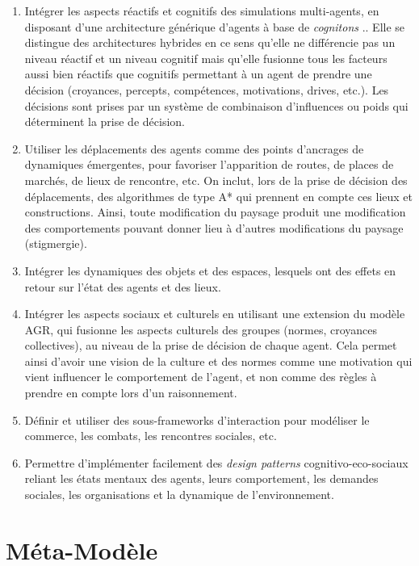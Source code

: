 \documentclass[a4paper,oneside,12 pt]{article}
\begin{document}
\begin{enumerate}
  \item Intégrer les aspects réactifs et cognitifs des simulations multi-agents, en disposant d’une architecture générique d’agents à base de \emph{cognitons} \cite{jacques1995systemes}.. Elle se distingue des architectures hybrides en ce sens qu’elle ne différencie pas un niveau réactif et un niveau cognitif mais qu’elle fusionne tous les facteurs aussi bien réactifs que cognitifs permettant à un agent de prendre une décision (croyances, percepts, compétences, motivations, drives, etc.). Les décisions sont prises par un système de combinaison d’influences ou poids qui déterminent la prise de décision.
  \item Utiliser les déplacements des agents comme des points d'ancrages de dynamiques émergentes, pour favoriser l'apparition de routes, de places de marchés, de lieux de rencontre, etc. On inclut, lors de la prise de décision des déplacements, des algorithmes de type A* qui prennent en compte ces lieux et constructions. Ainsi, toute modification du paysage produit une modification des comportements pouvant donner lieu à d'autres modifications du paysage (stigmergie).
  \item Intégrer les dynamiques des objets et des espaces, lesquels ont des effets en retour sur l'état des agents et des lieux.
  \item Intégrer les aspects sociaux et culturels en utilisant une extension du modèle AGR, qui fusionne les aspects culturels des groupes (normes, croyances collectives), au niveau de la prise de décision de chaque agent. Cela permet ainsi d'avoir une vision de la culture et des normes comme une motivation qui vient influencer le comportement de l'agent, et non comme des règles à prendre en compte lors d'un raisonnement.
  \item Définir et utiliser des sous-frameworks d'interaction pour modéliser le commerce, les combats, les rencontres sociales, etc.
  \item Permettre d'implémenter facilement des \emph{design patterns} cognitivo-eco-sociaux reliant les états mentaux des agents, leurs comportement, les demandes sociales, les organisations et la dynamique de l'environnement.
\end{enumerate}


\newpage
\section{Méta-Modèle}
\end{document}
